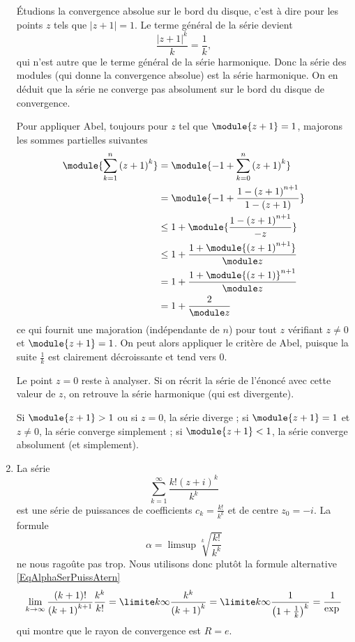 \documentclass[12pt,french,oneside,a4paper]{memoir} %
\begin{document}
\begin{exo}
\begin{correction}
\begin{enumerate}
Étudions la convergence absolue sur le bord du disque, c'est à dire pour les points $z$ tels que $| z+1 |=1$. Le terme général de la série devient
\begin{equation}
	\frac{ | z+1 |^k }{ k }=\frac{ 1 }{ k },
\end{equation}
qui n'est autre que le terme général de la série harmonique. Donc la série des modules (qui donne la convergence absolue) est la série harmonique. On en déduit que la série ne converge pas absolument sur le bord du disque de convergence.

Pour appliquer Abel, toujours pour $z$ tel que $\module{z+1} = 1$,
majorons les sommes partielles suivantes
\begin{equation*}
\begin{split}
\module{\sum_{k=1}^n {(z+1)}^k} &= \module{-1 + \sum_{k=0}^n
{(z+1)}^k}\\
&= \module{-1 + \frac{1 - {(z+1)}^{n+1}}{1 - (z + 1)}}\\
&\leq 1 + \module{\frac{1 - {(z+1)}^{n+1}}{-z}}\\
&\leq 1 + \frac{1 + \module{{(z+1)}^{n+1}}}{\module z}\\
&= 1 + \frac{1 + {\module{(z+1)}}^{n+1}}{\module z}\\
&= 1 + \frac{2}{\module z}
\end{split}
\end{equation*}
ce qui fournit une majoration (indépendante de $n$) pour tout $z$ vérifiant $z \neq 0$ et $\module{z+1}= 1$. On peut alors appliquer le critère de Abel, puisque la suite $\frac{1}{k}$ est clairement décroissante et tend vers $0$.

Le point $z = 0$ reste à analyser. Si on récrit la série de l'énoncé avec cette valeur de $z$, on retrouve la série harmonique (qui est divergente).

\conclusion
Si $\module{z+1} > 1$ ou si $z = 0$, la série diverge ; si $\module{z+1} = 1$ et $z \neq 0$, la série converge simplement ; si $\module{z+1} < 1$, la série converge absolument (et simplement).

\item La série
\begin{equation}\label{eq:seriepuissances-exo-c}
	\sum_{k=1}^\infty \frac{k! {(z+i)}^k}{k^k}
\end{equation}
est une série de puissances de coefficients $c_k = \frac{ k! }{ k^k }$ et de centre $z_0 = -i$. La formule
\begin{equation}
	\alpha=\limsup\sqrt[k]{\frac{ k! }{ k^k }}
\end{equation}
ne nous ragoûte pas trop. Nous utilisons donc plutôt la formule
alternative \eqref{EqAlphaSerPuissAtern} %
\begin{equation}
	\lim_{k\to \infty} \frac{(k+1)!}{{(k+1)}^{k+1}}\frac{k^k}{k!} = \limite k
	\infty \frac{k^k}{{(k+1)}^k} = \limite k \infty
	\frac{1}{{\left(1+\frac{1}{k}\right)}^k} = \frac 1 {\exp{ }}
\end{equation}
qui montre que le rayon de convergence est $R = e$.


\end{enumerate}
\end{correction}
\end{exo}
\end{document}
